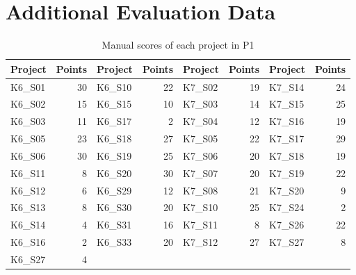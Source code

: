 \chapter{Additional Evaluation Data}
\label{cha:additional_evaluation_data}

\begin{table}[htpb]
    \centering
    \scriptsize
    \begin{tabular}{lr|lr|lr|lr}
        \toprule
        Project & Points & Project & Points & Project & Points & Project & Points \\
        \midrule
        K6\_S01 & 30 & K6\_S10 & 22 & K7\_S02 & 19 & K7\_S14 & 24 \\
        K6\_S02 & 15 & K6\_S15 & 10 & K7\_S03 & 14 & K7\_S15 & 25 \\
        K6\_S03 & 11 & K6\_S17 & 2  & K7\_S04 & 12 & K7\_S16 & 19 \\
        K6\_S05 & 23 & K6\_S18 & 27 & K7\_S05 & 22 & K7\_S17 & 29 \\
        K6\_S06 & 30 & K6\_S19 & 25 & K7\_S06 & 20 & K7\_S18 & 19 \\
        K6\_S11 & 8  & K6\_S20 & 30 & K7\_S07 & 20 & K7\_S19 & 22 \\
        K6\_S12 & 6  & K6\_S29 & 12 & K7\_S08 & 21 & K7\_S20 & 9  \\
        K6\_S13 & 8  & K6\_S30 & 20 & K7\_S10 & 25 & K7\_S24 & 2  \\
        K6\_S14 & 4  & K6\_S31 & 16 & K7\_S11 & 8  & K7\_S26 & 22 \\
        K6\_S16 & 2  & K6\_S33 & 20 & K7\_S12 & 27 & K7\_S27 & 8  \\
        K6\_S27 & 4  \\
        \bottomrule
    \end{tabular}
    \caption{Manual scores of each project in P1}
    \label{tab:manual_scores_of_each_project}
\end{table}


